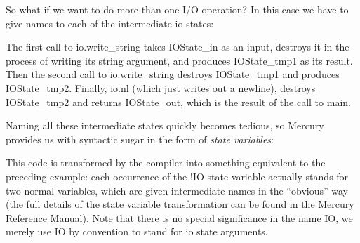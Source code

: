 \documentclass[a4paper,11pt,notitlepage,onecolumn]{book}
\begin{document}
So what if we want to do more than one I/O operation?  In this case we have
to give names to each of the intermediate \textsf{io} states:
\begin{small}

\begin{ptabular}
\nextline
{}
\nextline
{}
\nextline
{}
\nextline
\end{ptabular}

\end{small}
The first call to \textsf{io.write\_string} takes \textsf{IOState\_in} as an input, destroys it
in the process of writing its string argument, and produces \textsf{IOState\_tmp1} as its
result.  Then the second call to \textsf{io.write\_string} destroys \textsf{IOState\_tmp1}
and produces \textsf{IOState\_tmp2}.  Finally, \textsf{io.nl} (which just writes out a newline),
destroys \textsf{IOState\_tmp2} and returns \textsf{IOState\_out}, which is the result of the call to
\textsf{main}.

Naming all these intermediate states quickly becomes tedious, so Mercury
provides us with syntactic sugar in the form of \emph{state variables}:
\begin{small}

\begin{ptabular}
\nextline
{}
\nextline
{}
\nextline
{}
\nextline
\end{ptabular}

\end{small}
This code is transformed by the compiler into something equivalent to the
preceding example: each occurrence of the \textsf{!IO} state variable actually
stands for two normal variables, which are given intermediate names in the
``obvious'' way (the full details of the state variable transformation can
be found in the Mercury Reference Manual).  Note that there is no special
significance in the name \textsf{IO}, we merely use \textsf{IO} by convention to stand
for \textsf{io} state arguments.
\end{document}

